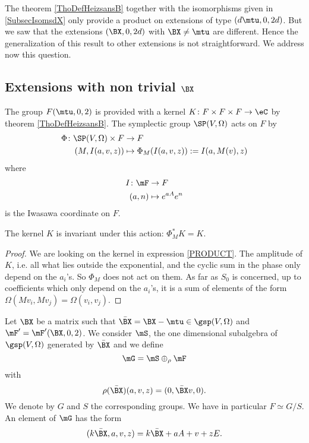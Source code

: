 The theorem \ref{ThoDefHeizsansB} together with the isomorphisms given in \ref{SubsecIsomsdX} only provide a product on extensions of type $(d\mtu,0,2d)$. But we saw that the extensions $(\BX ,0,2d)$ with $\BX \neq\mtu$ are different. Hence the generalization of this result to other extensions is not straightforward. We address now this question.

\subsection{Extensions with non trivial \texorpdfstring{$\protect\BX $}{X}} \label{subsecTrick}

The group $F(\mtu,0,2)$ is provided with a kernel $K\colon F\times F\times F\to \eC$ by theorem \ref{ThoDefHeizsansB}.  The symplectic group $\SP(V,\Omega)$ acts on $F$ by
\begin{equation}
\begin{aligned}
 \Phi\colon \SP(V,\Omega)\times F&\to F \\ 
(M,I(a,v,z))&\mapsto \Phi_{M}(I(a,v,z)):=I(a,M(v),z)
\end{aligned}
\end{equation}
where 
\begin{equation}
\begin{aligned}
 I\colon \mF&\to F \\ 
(a,n)&\mapsto  e^{aA} e^{n} 
\end{aligned}
\end{equation}
is the Iwasawa coordinate on $F$.

\begin{proposition}  
The kernel $K$ is invariant under this action: $\Phi^*_{M}K=K$.
 \label{PropkernelinvarSp}
\end{proposition}

\begin{proof}
We are looking on the kernel in expression \eqref{PRODUCT}. The amplitude of $K$, i.e. all what lies outside the exponential, and the cyclic sum in the phase only depend on the $a_{i}$'s. So $\Phi_{M}$ does not act on them. As far as $S_{0}$ is concerned, up to coefficients which only depend on the $a_{i}$'s, it is a sum of elements of the form $\Omega(Mv_{i},Mv_{j})=\Omega(v_{i},v_{j})$.
\end{proof}

Let $\BX $ be a matrix such that $\bar{\BX }=\BX -\mtu\in\gsp(V,\Omega)$ and $\mF'=\mF'(\BX,0,2)$. We consider $\mS$, the one dimensional subalgebra of $\gsp(V,\Omega)$ generated by $\bar{\BX}$ and we define
\begin{equation}
  \mG=\mS\oplus_{\rho}\mF
\end{equation} 
with 
\[ 
  \rho(\bar{\BX })(a,v,z)=(0,\bar{\BX }v,0).
\]
We denote by $G$ and $S$ the corresponding groups. We have in particular $F\simeq G/S$. An element of $\mG$ has the form
\begin{equation}    \label{EqDefkavzG}
  (k\bar\BX,a,v,z)=k\bar\BX+aA+v+zE.
\end{equation}


